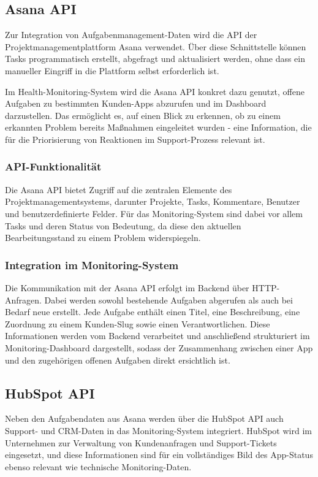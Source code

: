 \subsection{Asana API}
Zur Integration von Aufgabenmanagement-Daten wird die API der Projektmanagementplattform Asana verwendet. Über diese Schnittstelle können Tasks programmatisch erstellt, abgefragt und aktualisiert werden, ohne dass ein manueller Eingriff in die Plattform selbst erforderlich ist. \cite{asana_docs}

Im Health-Monitoring-System wird die Asana API konkret dazu genutzt, offene Aufgaben zu bestimmten Kunden-Apps abzurufen und im Dashboard darzustellen. Das ermöglicht es, auf einen Blick zu erkennen, ob zu einem erkannten Problem bereits Maßnahmen eingeleitet wurden - eine Information, die für die Priorisierung von Reaktionen im Support-Prozess relevant ist.

\subsubsection{API-Funktionalität}
Die Asana API bietet Zugriff auf die zentralen Elemente des Projektmanagementsystems, darunter Projekte, Tasks, Kommentare, Benutzer und benutzerdefinierte Felder. Für das Monitoring-System sind dabei vor allem Tasks und deren Status von Bedeutung, da diese den aktuellen Bearbeitungsstand zu einem Problem widerspiegeln.

\subsubsection{Integration im Monitoring-System}
Die Kommunikation mit der Asana API erfolgt im Backend über HTTP-Anfragen. Dabei werden sowohl bestehende Aufgaben abgerufen als auch bei Bedarf neue erstellt. Jede Aufgabe enthält einen Titel, eine Beschreibung, eine Zuordnung zu einem Kunden-Slug sowie einen Verantwortlichen. Diese Informationen werden vom Backend verarbeitet und anschließend strukturiert im Monitoring-Dashboard dargestellt, sodass der Zusammenhang zwischen einer App und den zugehörigen offenen Aufgaben direkt ersichtlich ist.


\subsection{HubSpot API}
Neben den Aufgabendaten aus Asana werden über die HubSpot API auch Support- und CRM-Daten in das Monitoring-System integriert. HubSpot wird im Unternehmen zur Verwaltung von Kundenanfragen und Support-Tickets eingesetzt, und diese Informationen sind für ein vollständiges Bild des App-Status ebenso relevant wie technische Monitoring-Daten. \cite{hubspot_docs}

